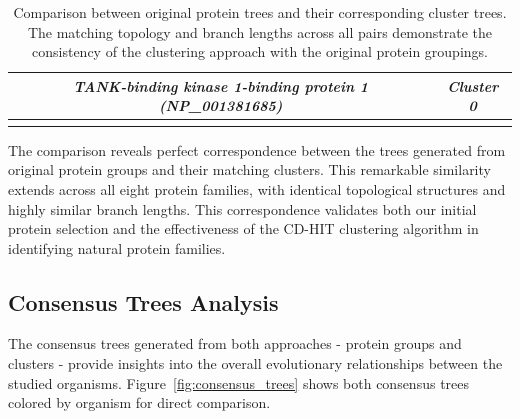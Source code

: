 \documentclass[11pt, a4paper, hidelinks]{article}
\begin{document}
\begin{longtable}{|c|c|}
        \hline
        \textit{TANK-binding kinase 1-binding protein 1 (NP\_001381685)} & \textit{Cluster 0} \\
        \hline
    \caption{Comparison between original protein trees and their corresponding cluster trees. The matching topology and branch lengths across all pairs demonstrate the consistency of the clustering approach with the original protein groupings.}
    \label{fig:tree_pairs}
\end{longtable}

The comparison reveals perfect correspondence between the trees generated from original protein groups and their matching clusters. This remarkable similarity extends across all eight protein families, with identical topological structures and highly similar branch lengths. This correspondence validates both our initial protein selection and the effectiveness of the CD-HIT clustering algorithm in identifying natural protein families.

\subsection{Consensus Trees Analysis}\label{subsec:consensus-trees-analysis}

The consensus trees generated from both approaches - protein groups and clusters - provide insights into the overall evolutionary relationships between the studied organisms. Figure~\ref{fig:consensus_trees} shows both consensus trees colored by organism for direct comparison.
\end{document}
